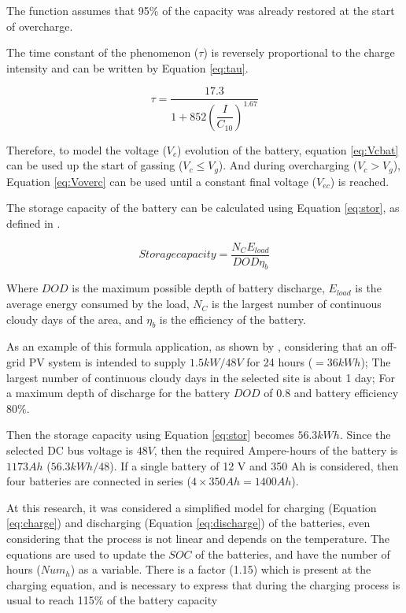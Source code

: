 \documentclass[journal]{IEEEtran}
\begin{document}
The function assumes that 95\% of the capacity was already restored at the start of overcharge.

The time constant of the phenomenon ($ \tau $) is reversely proportional to the charge intensity and can be written by Equation \ref{eq:tau}.

\begin{equation}
\label{eq:tau}
\tau = \dfrac{17.3}{1+852 \left( \dfrac{I}{C_{10}} \right) ^{1.67} }
\end{equation}

Therefore, to model the voltage ($ V_{c} $) evolution of the battery, equation \ref{eq:Vcbat} can be used up the start of gassing ($ V_{c} \leq V_{g} $). And during overcharging ($ V_{c} > V_{g} $), Equation \ref{eq:Voverc} can be used until a constant final voltage ($ V_{ec} $) is reached.

The storage capacity of the battery can be calculated using Equation \ref{eq:stor}, as defined in \cite{Wenham}.

\begin{equation}
\label{eq:stor}
Storage capacity = \dfrac{N_{C}E_{load}}{DOD \eta _{b}}
\end{equation}

Where $ DOD $ is the maximum possible depth of battery discharge, $ E_{load} $ is the average energy consumed by the load, $ N_{C} $ is the largest number of continuous cloudy days of the area, and $ \eta_{b} $ is the efficiency of the battery.

As an example of this formula application, as shown by \cite{Abdulateef}, considering that an off-grid PV system is intended to supply $1.5 kW/48 V$ for 24 hours ($=36 kWh$); The largest number of continuous cloudy days in the selected site is about 1 day; For a maximum depth of discharge for the battery $DOD$ of $0.8$ and battery efficiency $80\%$.

Then the storage capacity using Equation \ref{eq:stor} becomes $56.3 kWh$. Since the selected DC bus voltage is $48 V$, then the required Ampere-hours of the battery is $1173 Ah$ ($56.3 kWh/48$). If a single battery of 12 V and 350 Ah is considered, then four batteries are connected in series ($4 \times 350 Ah = 1400 Ah$).

At this research, it was considered a simplified model for charging (Equation \ref{eq:charge}) and discharging (Equation \ref{eq:discharge}) of the batteries, even considering that the process is not linear and depends on the temperature. The equations are used to update the $SOC$ of the batteries, and have the number of hours ($ Num_{h} $) as a variable. There is a factor (1.15) which is present at the charging equation, and is necessary to express that during the charging process is usual to reach 115\% of the battery capacity
\end{document}
